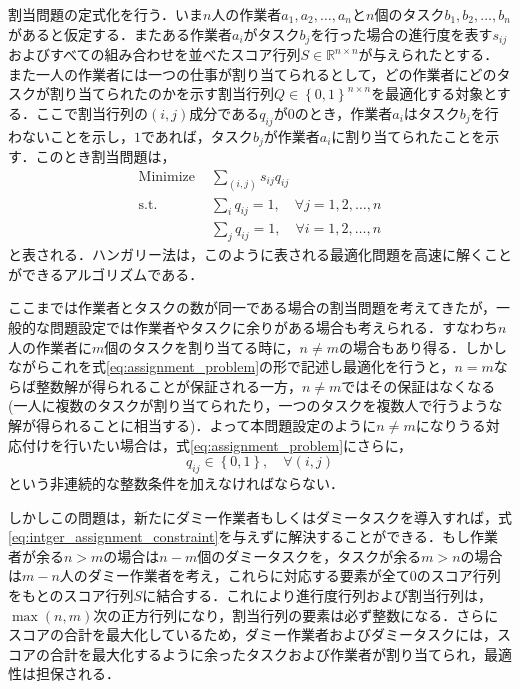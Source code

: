     割当問題の定式化を行う．いま$n$人の作業者$a_1, a_2, \dots, a_n$と$n$個のタスク$b_1, b_2, \dots, b_n$があると仮定する．またある作業者$a_i$がタスク$b_j$を行った場合の進行度を表す$s_{ij}$およびすべての組み合わせを並べたスコア行列$S \in \mathbb{R}^{n \times n}$が与えられたとする．また一人の作業者には一つの仕事が割り当てられるとして，どの作業者にどのタスクが割り当てられたのかを示す割当行列$Q \in \left\{0, 1\right\}^{n \times n}$を最適化する対象とする．ここで割当行列の$(i,j)$成分である$q_{ij}$が$0$のとき，作業者$a_i$はタスク$b_j$を行わないことを示し，$1$であれば，タスク$b_j$が作業者$a_i$に割り当てられたことを示す．このとき割当問題は，
    \begin{equation}
        \label{eq:assignment_problem}
        \begin{aligned}
            \text{Minimize }& \sum _{(i, j)} s_{ij} q_{ij}  
            \\ \text{s.t. }& \sum_i q_{ij} = 1,\quad \forall j = 1, 2, \dots, n
            \\ \phantom{\text{s.t.} }& \sum_j q_{ij} = 1,\quad \forall i = 1,2,\dots, n
        \end{aligned}
    \end{equation}
    と表される．ハンガリー法\cite{kuhn1955hungarian}は，このように表される最適化問題を高速に解くことができるアルゴリズムである．

    ここまでは作業者とタスクの数が同一である場合の割当問題を考えてきたが，一般的な問題設定では作業者やタスクに余りがある場合も考えられる．すなわち$n$人の作業者に$m$個のタスクを割り当てる時に，$n \neq m$の場合もあり得る．しかしながらこれを式\ref{eq:assignment_problem}の形で記述し最適化を行うと，$n=m$ならば整数解が得られることが保証される一方，$n\neq m$ではその保証はなくなる (一人に複数のタスクが割り当てられたり，一つのタスクを複数人で行うような解が得られることに相当する)．よって本問題設定のように$n \neq m$になりうる対応付けを行いたい場合は，式\ref{eq:assignment_problem}にさらに，
    \begin{equation}
        \label{eq:intger_assignment_constraint}
        q_{ij} \in \left\{0, 1\right\}, \quad \forall (i,j)
    \end{equation}
    という非連続的な整数条件を加えなければならない．

    しかしこの問題は，新たにダミー作業者もしくはダミータスクを導入すれば，式\ref{eq:intger_assignment_constraint}を与えずに解決することができる．もし作業者が余る$n > m$の場合は$n-m$個のダミータスクを，タスクが余る$m > n$の場合は$m-n$人のダミー作業者を考え，これらに対応する要素が全て$0$のスコア行列をもとのスコア行列$S$に結合する．これにより進行度行列および割当行列は，$\max(n, m)$次の正方行列になり，割当行列の要素は必ず整数になる．さらにスコアの合計を最大化しているため，ダミー作業者およびダミータスクには，スコアの合計を最大化するように余ったタスクおよび作業者が割り当てられ，最適性は担保される．

